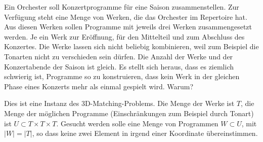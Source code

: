 Ein Orchester soll Konzertprogramme für eine Saison zusammenstellen.
Zur Verfügung steht eine Menge von Werken, die das Orchester im Repertoire hat.
Aus diesen Werken sollen Programme mit jeweils drei Werken zusammengesetzt
werden.
Je ein Werk zur Eröffnung, für den Mittelteil und zum Abschluss des
Konzertes.
Die Werke lassen sich nicht beliebig kombinieren, weil zum Beispiel die
Tonarten nicht zu verschieden sein dürfen.
Die Anzahl der Werke und der Konzertabende der Saison ist gleich.
Es stellt sich heraus, dass es ziemlich schwierig ist, Programme so
zu konstruieren, dass kein Werk in der gleichen Phase eines Konzerts
mehr als einmal gespielt wird.
Warum?

\begin{loesung}
Dies ist eine Instanz des 3D-Matching-Problems.
Die Menge der Werke ist $T$, die Menge der möglichen Programme (Einschränkungen
zum Beispiel durch Tonart) ist $U\subset T\times T\times T$.
Gesucht werden solle eine Menge von Programmen $W\subset U$, mit
$|W|=|T|$, so dass keine zwei Element in irgend einer Koordinate
übereinstimmen.
\end{loesung}



